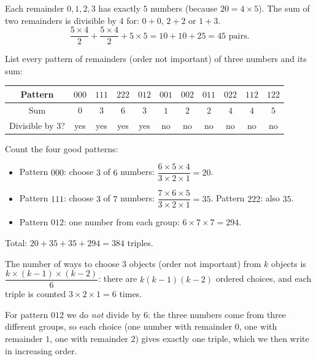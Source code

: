 {
Each remainder $0,1,2,3$ has exactly $5$ numbers (because $20=4\times5$). The sum of two remainders is divisible by $4$ for: $0+0$, $2+2$
or $1+3$.
\[\frac{5\times4}{2}+\frac{5\times4}{2}+5\times5=10+10+25=45 \text{ pairs.}\]

List every pattern of remainders (order not important) of three numbers and its sum:
\begin{center}\begin{tabular}{|c|c|c|c|c|c|c|c|c|c|c|}\hline
Pattern & $000$ & $111$ & $222$ & $012$ & $001$ & $002$ & $011$ & $022$ & $112$ & $122$\\\hline
Sum & $0$ & $3$ & $6$ & $3$ & $1$ & $2$ & $2$ & $4$ & $4$ & $5$\\\hline
Divisible by $3$? & yes & yes & yes & yes & no & no & no & no & no & no\\\hline
\end{tabular}\end{center}
Count the four good patterns:
\begin{itemize}[leftmargin=1.2em,itemsep=1pt,topsep=2pt]
\item Pattern $000$: choose $3$ of $6$ numbers: $\dfrac{6\times5\times4}{3\times2\times1}=20$.
\item Pattern $111$: choose $3$ of $7$ numbers: $\dfrac{7\times6\times5}{3\times2\times1}=35$. Pattern $222$: also $35$.
\item Pattern $012$: one number from each group: $6\times7\times7=294$.
\end{itemize}
Total: $20+35+35+294=384$ triples.
\begin{recallbox}The number of ways to choose $3$ objects (order not important) from $k$ objects is $\dfrac{k\times(k-1)\times(k-2)}{6}$:
there are $k(k-1)(k-2)$ ordered choices, and each triple is counted $3\times2\times1=6$ times.\end{recallbox}
\begin{warnbox}For pattern $012$ we do \emph{not} divide by $6$: the three numbers come from three different groups, so each choice (one number
with remainder $0$, one with remainder $1$, one with remainder $2$) gives exactly one triple, which we then write in increasing order.\end{warnbox}
}

